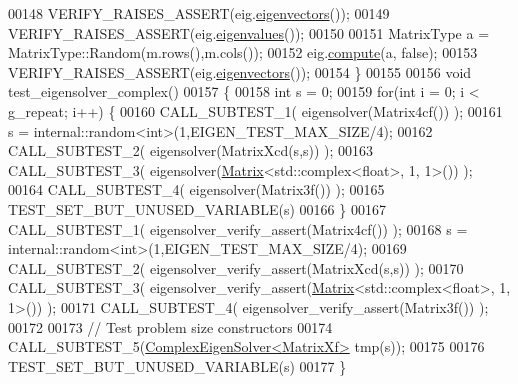 \begin{DoxyCode}
00148   VERIFY\_RAISES\_ASSERT(eig.\hyperlink{group___eigenvalues___module_a3aa5e27800349990778da8fa532c1270}{eigenvectors}());
00149   VERIFY\_RAISES\_ASSERT(eig.\hyperlink{group___eigenvalues___module_a10c25c7620e7faedcd39991cce3a757b}{eigenvalues}());
00150 
00151   MatrixType a = MatrixType::Random(m.rows(),m.cols());
00152   eig.\hyperlink{group___eigenvalues___module_aeb7e38c6db5369f5c974f3786e94c1f0}{compute}(a, \textcolor{keyword}{false});
00153   VERIFY\_RAISES\_ASSERT(eig.\hyperlink{group___eigenvalues___module_a3aa5e27800349990778da8fa532c1270}{eigenvectors}());
00154 \}
00155 
00156 \textcolor{keywordtype}{void} test\_eigensolver\_complex()
00157 \{
00158   \textcolor{keywordtype}{int} s = 0;
00159   \textcolor{keywordflow}{for}(\textcolor{keywordtype}{int} i = 0; i < g\_repeat; i++) \{
00160     CALL\_SUBTEST\_1( eigensolver(Matrix4cf()) );
00161     s = internal::random<int>(1,EIGEN\_TEST\_MAX\_SIZE/4);
00162     CALL\_SUBTEST\_2( eigensolver(MatrixXcd(s,s)) );
00163     CALL\_SUBTEST\_3( eigensolver(\hyperlink{group___core___module_class_eigen_1_1_matrix}{Matrix}<std::complex<float>, 1, 1>()) );
00164     CALL\_SUBTEST\_4( eigensolver(Matrix3f()) );
00165     TEST\_SET\_BUT\_UNUSED\_VARIABLE(s)
00166   \}
00167   CALL\_SUBTEST\_1( eigensolver\_verify\_assert(Matrix4cf()) );
00168   s = internal::random<int>(1,EIGEN\_TEST\_MAX\_SIZE/4);
00169   CALL\_SUBTEST\_2( eigensolver\_verify\_assert(MatrixXcd(s,s)) );
00170   CALL\_SUBTEST\_3( eigensolver\_verify\_assert(\hyperlink{group___core___module_class_eigen_1_1_matrix}{Matrix}<std::complex<float>, 1, 1>()) );
00171   CALL\_SUBTEST\_4( eigensolver\_verify\_assert(Matrix3f()) );
00172 
00173   \textcolor{comment}{// Test problem size constructors}
00174   CALL\_SUBTEST\_5(\hyperlink{group___eigenvalues___module_class_eigen_1_1_complex_eigen_solver}{ComplexEigenSolver<MatrixXf>} tmp(s));
00175   
00176   TEST\_SET\_BUT\_UNUSED\_VARIABLE(s)
00177 \}
\end{DoxyCode}
